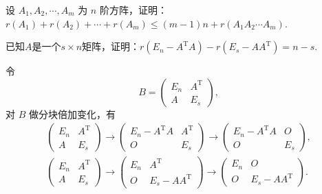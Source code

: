 \begin{exercise}
\begin{exgroup}
        \item 设 $A_1, A_2, \cdots, A_m$ 为 $n$ 阶方阵，证明：$r(A_1) + r(A_2) + \cdots + r(A_m) \leqslant (m - 1)n + r(A_1A_2 \cdots A_m)$.
        \begin{answer}

        \end{answer}

        \item 已知$A$是一个$s \times n$矩阵，证明：$r(E_n-A^\mathrm{T}A)-r(E_s-AA^\mathrm{T})=n-s$.
        \begin{answer}
            令
            \[
                B = \begin{pmatrix}
                    E_n & A^\mathrm{T} \\
                    A   & E_s
                \end{pmatrix},
            \]
            对 $B$ 做分块倍加变化，有
            \begin{gather*}
                \begin{pmatrix}
                    E_n & A^\mathrm{T} \\
                    A   & E_s
                \end{pmatrix} \to \begin{pmatrix}
                    E_n - A^\mathrm{T}A & A^\mathrm{T} \\
                    O                   & E_s
                \end{pmatrix} \to \begin{pmatrix}
                    E_n - A^\mathrm{T}A & O   \\
                    O                   & E_s
                \end{pmatrix}, \\
                \begin{pmatrix}
                    E_n & A^\mathrm{T} \\
                    A   & E_s
                \end{pmatrix} \to \begin{pmatrix}
                    E_n & A^\mathrm{T}        \\
                    O   & E_s - AA^\mathrm{T}
                \end{pmatrix} \to \begin{pmatrix}
                    E_n & O                   \\
                    O   & E_s - AA^\mathrm{T}
                \end{pmatrix}.

\end{gather*}
\end{answer}
\end{exgroup}
\end{exercise}
